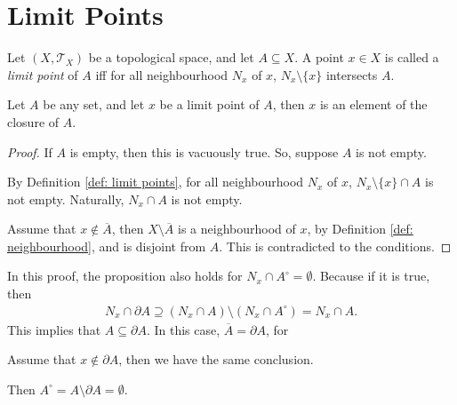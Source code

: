 \section{Limit Points}


\begin{definition}
	\label{def: limit points}
	Let $(X, \mathcal T_X)$ be a topological space, and let $A \subseteq X$. A point $x \in X$ is called a \textit{limit point} of $A$ iff for all neighbourhood $N_x$ of $x$, $N_x \setminus \{x\}$ intersects $A$.
\end{definition}

\begin{proposition}
	\label{prop: limit points are always in the closure}
	Let $A$ be any set, and let $x$ be a limit point of $A$, then $x$ is an element of the closure of $A$.
	
	\begin{proof}
		If $A$ is empty, then this is vacuously true. So, suppose $A$ is not empty.
	
		By Definition \ref{def: limit points}, for all neighbourhood $N_x$ of $x$, $N_x \setminus \{x\} \cap A$ is not empty. Naturally, $N_x \cap A$ is not empty.
		
		Assume that $x \notin \overline A$, then $X \setminus \overline A$ is a neighbourhood of $x$, by Definition \ref{def: neighbourhood}, and is disjoint from $A$. This is contradicted to the conditions.
	\end{proof}
\end{proposition}


\begin{note}
	In this proof, the proposition also holds for $N_x \cap A^\circ = \emptyset$. Because if it is true, then
	$$
	\begin{aligned}
		N_x \cap \partial A \supseteq (N_x \cap A) \setminus (N_x \cap A^\circ) = N_x \cap A.
	\end{aligned}
	$$
	This implies that $A \subseteq \partial A$. In this case, $\overline A = \partial A$, for
	
	Assume that $x\notin \partial A$, then we have the same conclusion.
	
	Then $A^\circ = A \setminus \partial A = \emptyset$. 
\end{note}


